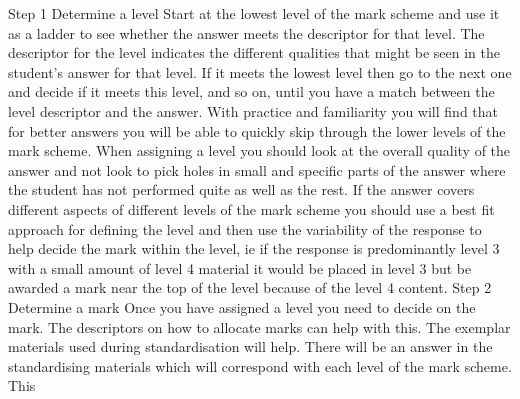 \documentclass{article}
\begin{document}
 \newline
Step 1 Determine a level \newline
 \newline
Start at the lowest level of the mark scheme and use it as a ladder to see whether the answer meets the \newline
descriptor for that level.  The descriptor for the level indicates the different qualities that might be seen in \newline
the student’s answer for that level.  If it meets the lowest level then go to the next one and decide if it \newline
meets this level, and so on, until you have a match between the level descriptor and the answer.  With \newline
practice and familiarity you will find that for better answers you will be able to quickly skip through the \newline
lower levels of the mark scheme. \newline
 \newline
When assigning a level you should look at the overall quality of the answer and not look to pick holes in \newline
small and specific parts of the answer where the student has not performed quite as well as the rest.  If \newline
the answer covers different aspects of different levels of the mark scheme you should use a best fit \newline
approach for defining the level and then use the variability of the response to help decide the mark within \newline
the level, ie if the response is predominantly level 3 with a small amount of level 4 material it would be \newline
placed in level 3 but be awarded a mark near the top of the level because of the level 4 content. \newline
 \newline
Step 2 Determine a mark \newline
 \newline
Once you have assigned a level you need to decide on the mark.  The descriptors on how to allocate \newline
marks can help with this.  The exemplar materials used during standardisation will help.  There will be an \newline
answer in the standardising materials which will correspond with each level of the mark scheme.  This \newline
\end{document}
